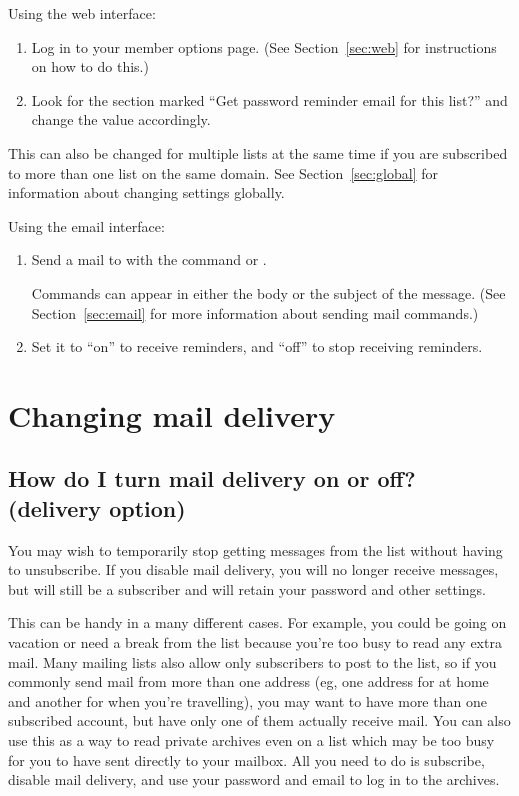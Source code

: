 \documentclass{howto}
\begin{document}
Using the web interface:
\begin{enumerate}
	\item Log in to your member options page.  (See Section~\ref{sec:web} for 
	instructions on how to do this.)
	\item Look for the section marked ``Get password reminder email for this
	list?'' and change the value accordingly.
\end{enumerate}

This can also be changed for multiple lists at the same time if you are subscribed to 
more than one list on the same domain.  See Section~\ref{sec:global} for 
information about changing settings globally.

Using the email interface:
\begin{enumerate}
   \item Send a mail to  with the command
    or .

   Commands can appear
   in either the body or the subject of the message.  (See
   Section~\ref{sec:email} for more information about sending mail
   commands.)
	\item Set it to ``on'' to receive reminders, and ``off'' to stop receiving
	reminders.
\end{enumerate}


\section{Changing mail delivery}
\subsection{How do I turn mail delivery on or off? 
	(delivery option)\label{sec:nomail}}

You may wish to temporarily stop getting messages from the 
list without having to unsubscribe.
If you disable mail delivery, you will no longer receive messages, but will
still be a subscriber and will retain your password and other settings.  

This can be handy in a many different cases.  For example, you could be 
going on vacation or need a break from the list because you're too busy to 
read any extra mail. 
Many mailing lists also allow only subscribers to post to the list, so if you
commonly send mail from more than one address (eg, one address for at home
and another for when you're travelling), you may want to have more than
one subscribed account, but have only one of them actually receive mail.
You can also use this as a way to read private archives even on a list which
may be too busy for you to have sent directly to your mailbox.  All you need to do is subscribe, disable mail delivery, and use your password and email to 
log in to the archives.
\end{document}
